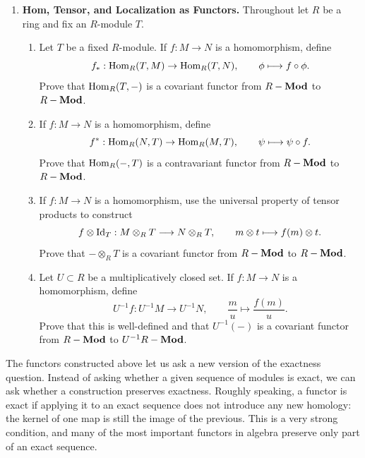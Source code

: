 \documentclass[12pt,reqno]{amsart}
\begin{document}
\begin{enumerate}[leftmargin=*, resume=problems]
\item \textbf{Hom, Tensor, and Localization as Functors.} Throughout let $R$ be a ring and fix an $R$-module $T$.
\begin{enumerate}
\item Let $T$ be a fixed $R$-module. If $f:M\to N$ is a homomorphism, define
\[
f_*:\operatorname{Hom}_R(T,M)\to \operatorname{Hom}_R(T,N),
\qquad
\phi\longmapsto f\circ \phi.
\]
Prove that $\operatorname{Hom}_R(T,-)$ is a covariant functor from $R-\operatorname{\textbf{Mod}}$ to $R-\operatorname{\textbf{Mod}}$.
\item If $f:M\to N$ is a homomorphism, define
\[
f^*:\operatorname{Hom}_R(N,T)\to \operatorname{Hom}_R(M,T),
\qquad
\psi\longmapsto \psi\circ f.
\]
Prove that $\operatorname{Hom}_R(-,T)$ is a contravariant functor from $R-\operatorname{\textbf{Mod}}$ to $R-\operatorname{\textbf{Mod}}$.
\item If $f:M\to N$ is a homomorphism, use the universal property of tensor products to construct
\[
f\otimes \operatorname{Id}_T:M\otimes_R T\longrightarrow N\otimes_R T,
\qquad
m\otimes t\longmapsto f(m)\otimes t.
\]
Prove that $-\otimes_R T$ is a covariant functor from $R-\operatorname{\textbf{Mod}}$ to $R-\operatorname{\textbf{Mod}}$.
\item Let $U\subset R$ be a multiplicatively closed set. If $f:M\to N$ is a homomorphism, define
\[
U^{-1}f:U^{-1}M\to U^{-1}N,
\qquad
\frac{m}{u}\longmapsto \frac{f(m)}{u}.
\]
Prove that this is well-defined and that $U^{-1}(-)$ is a covariant functor from $R-\operatorname{\textbf{Mod}}$ to $U^{-1}R-\operatorname{\textbf{Mod}}$.
\end{enumerate}
\end{enumerate}

\hrulefill

The functors constructed above let us ask a new version of the exactness question. Instead of asking whether a given sequence of modules is exact, we can ask whether a construction preserves exactness. Roughly speaking, a functor is exact if applying it to an exact sequence does not introduce any new homology: the kernel of one map is still the image of the previous. This is a very strong condition, and many of the most important functors in algebra preserve only part of an exact sequence.
\end{document}
